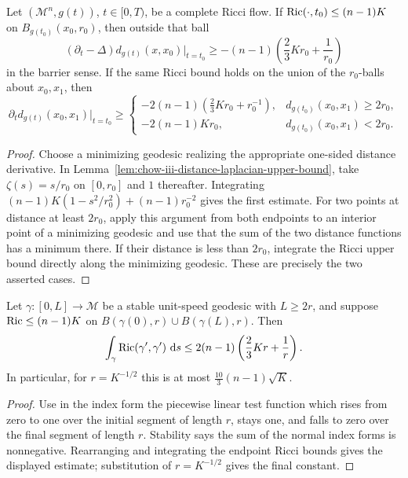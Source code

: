 \begin{theorem}
\label{thm:chow-iii-changing-distances}


Let \((\mathcal M^n,g(t))\), \(t\in[0,T)\), be a complete Ricci flow.
If \(\operatorname{Ric}(\cdot,t_0)\le(n-1)K\) on \(B_{g(t_0)}(x_0,r_0)\), then outside
that ball
\[
 (\partial_t-\Delta)d_{g(t)}(x,x_0)|_{t=t_0}
 \ge-(n-1)\left(\frac23Kr_0+\frac1{r_0}\right)
\]
in the barrier sense.  If the same Ricci bound holds on the union of the
\(r_0\)-balls about \(x_0,x_1\), then
\[
 \partial_td_{g(t)}(x_0,x_1)|_{t=t_0}\ge
 \begin{cases}
 -2(n-1)(\frac23Kr_0+r_0^{-1}),&d_{g(t_0)}(x_0,x_1)\ge2r_0,\\
 -2(n-1)Kr_0,&d_{g(t_0)}(x_0,x_1)<2r_0.
 \end{cases}
\]
\end{theorem}
\begin{proof}
\sketch Choose a minimizing geodesic realizing the appropriate one-sided distance
derivative.  In Lemma~\ref{lem:chow-iii-distance-laplacian-upper-bound}, take
\(\zeta(s)=s/r_0\) on \([0,r_0]\) and \(1\) thereafter.  Integrating
\((n-1)K(1-s^2/r_0^2)+(n-1)r_0^{-2}\) gives the first estimate.  For two
points at distance at least \(2r_0\), apply this argument from both endpoints
to an interior point of a minimizing geodesic and use that the sum of the two
distance functions has a minimum there.  If their distance is less than
\(2r_0\), integrate the Ricci upper bound directly along the minimizing
geodesic.  These are precisely the two asserted cases.
\end{proof}

\begin{proposition}
\label{prop:chow-iii-ricci-integral-stable-geodesic}


Let \(\gamma:[0,L]\to\mathcal M\) be a stable unit-speed geodesic with
\(L\ge2r\), and suppose
\(\operatorname{Ric}\le(n-1)K\) on \(B(\gamma(0),r)\cup B(\gamma(L),r)\).  Then
\[
 \int_\gamma\operatorname{Ric}(\gamma',\gamma')\,\,\mathrm{d} s
 \le2(n-1)\left(\frac23Kr+\frac1r\right).
\]
In particular, for \(r=K^{-1/2}\) this is at most
\(\frac{10}{3}(n-1)\sqrt K\).
\end{proposition}
\begin{proof}
\sketch Use in the index form the piecewise linear test function which rises from
zero to one over the initial segment of length \(r\), stays one, and falls to
zero over the final segment of length \(r\).  Stability says the sum of the
normal index forms is nonnegative.  Rearranging and integrating the endpoint
Ricci bounds gives the displayed estimate; substitution of \(r=K^{-1/2}\)
gives the final constant.
\end{proof}


